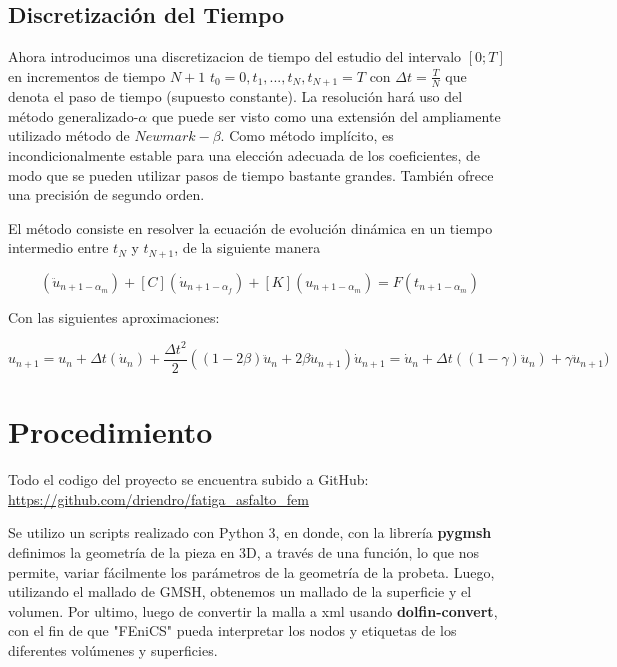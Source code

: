 \documentclass[12pt, a4paper]{article}
\begin{document}
\subsection{Discretización del Tiempo}

Ahora introducimos una discretizacion de tiempo del estudio del intervalo $[0;T]$ en incrementos de tiempo $N+1$ $t_0=0,t_1,...,t_N,t_{N+1}=T$ con $\Delta t=\frac{T}{N}$ que denota el paso de tiempo (supuesto constante). La resolución hará uso del método generalizado-$\alpha$ que puede ser visto como una extensión del ampliamente utilizado método de $Newmark-\beta$. Como método implícito, es incondicionalmente estable para una elección adecuada de los coeficientes, de modo que se pueden utilizar pasos de tiempo bastante grandes. También ofrece una precisión de segundo orden.

El método consiste en resolver la ecuación de evolución dinámica en un tiempo intermedio entre $t_N$ y $t_{N+1}$, de la siguiente manera

\begin{equation}
	[M](\ddot{u}_{n+1-\alpha_m})+[C](\dot{u}_{n+1-\alpha_f})+[K](u_{n+1-\alpha_m})=F(t_{n+1-\alpha_m})
\end{equation}

Con las siguientes aproximaciones:

\begin{equation}
	u_{n+1} = u_n + \Delta t(\dot{u}_n) + \frac{\Delta t^2}{2}((1-2\beta)\ddot{u}_n + 2 \beta \ddot{u}_{n+1})
	\dot{u}_{n+1} = \dot{u}_n + \Delta t((1- \gamma )\ddot{u}_n) + \gamma \ddot{u}_{n+1})
\end{equation}

\section{Procedimiento}

Todo el codigo del proyecto se encuentra subido a GitHub: \url{https://github.com/driendro/fatiga_asfalto_fem}

Se utilizo un scripts realizado con Python 3, en donde, con la librería \textbf{pygmsh} definimos la geometría de la pieza en 3D, a través de una función, lo que nos permite, variar fácilmente los parámetros de la geometría de la probeta. Luego, utilizando el mallado de GMSH, obtenemos un mallado de la superficie y el volumen. Por ultimo, luego de convertir la malla a xml usando \textbf{dolfin-convert}, con el fin de que "FEniCS" pueda interpretar los nodos y etiquetas de los diferentes volúmenes y superficies.
\end{document}
